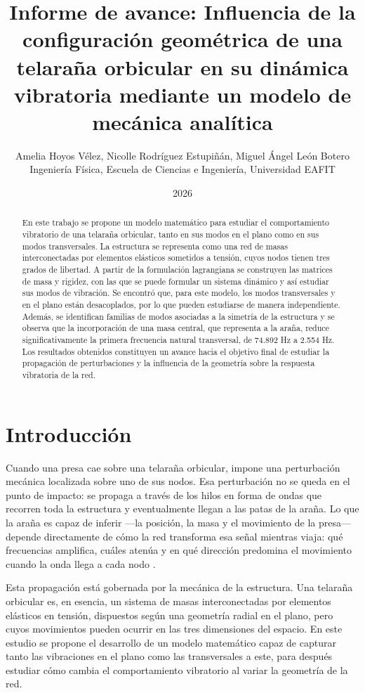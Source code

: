 \documentclass[11pt,letterpaper]{article}
\title{\textbf{Informe de avance: Influencia de la configuración geométrica de una telaraña orbicular en su dinámica vibratoria mediante un modelo de mecánica analítica}}
\author{Amelia Hoyos Vélez, Nicolle Rodríguez Estupiñán, Miguel Ángel León Botero\\[0.2cm]
\small Ingeniería Física, Escuela de Ciencias e Ingeniería, Universidad EAFIT}
\date{2026}
\begin{document}
\maketitle
\vspace{-0.5em}

\begin{abstract}
En este trabajo se propone un modelo matemático para estudiar el comportamiento vibratorio de una telaraña orbicular, tanto en sus modos en el plano como en sus modos transversales. La estructura se representa como una red de masas interconectadas por elementos elásticos sometidos a tensión, cuyos nodos tienen tres grados de libertad. A partir de la formulación lagrangiana se construyen las matrices de masa y rigidez, con las que se puede formular un sistema dinámico y así estudiar sus modos de vibración. Se encontró que, para este modelo, los modos transversales y en el plano están desacoplados, por lo que pueden estudiarse de manera independiente. Además, se identifican familias de modos asociadas a la simetría de la estructura y se observa que la incorporación de una masa central, que representa a la araña, reduce significativamente la primera frecuencia natural transversal, de 74.892 Hz a 2.554 Hz. Los resultados obtenidos constituyen un avance hacia el objetivo final de estudiar la propagación de perturbaciones y la influencia de la geometría sobre la respuesta vibratoria de la red.
\end{abstract}

\section{Introducción}
Cuando una presa cae sobre una telaraña orbicular, impone una perturbación mecánica localizada sobre uno de sus nodos. Esa perturbación no se queda en el punto de impacto: se propaga a través de los hilos en forma de ondas que recorren toda la estructura y eventualmente llegan a las patas de la araña. Lo que la araña es capaz de inferir —la posición, la masa y el movimiento de la presa— depende directamente de cómo la red transforma esa señal mientras viaja: qué frecuencias amplifica, cuáles atenúa y en qué dirección predomina el movimiento cuando la onda llega a cada nodo \cite{mortimer2016,masters1981}.

Esta propagación está gobernada por la mecánica de la estructura. Una telaraña orbicular es, en esencia, un sistema de masas interconectadas por elementos elásticos en tensión, dispuestos según una geometría radial en el plano, pero cuyos movimientos pueden ocurrir en las tres dimensiones del espacio. En este estudio se propone el desarrollo de un modelo matemático capaz de capturar tanto las vibraciones en el plano como las transversales a este, para después estudiar cómo cambia el comportamiento vibratorio al variar la geometría de la red.
\end{document}
